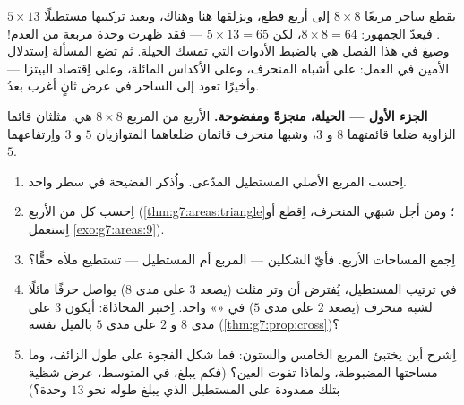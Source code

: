 \begin{problem}[{مسألة نهاية الأسبوع --- «برهان» مشهور على أن
$64 = 65$، تفضحه المساحات والميول، مع بيتزا وحلقات
للحلوى}]
\label{pb:g7:areas:1}
يقطع ساحر مربعًا $8 \times 8$ إلى أربع قطع، ويزلقها
هنا وهناك، ويعيد تركيبها مستطيلًا $5 \times 13$.
فيعدّ الجمهور: $8 \times 8 = 64$، لكن
$5 \times 13 = 65$ --- فقد ظهرت وحدة مربعة من
العدم! وصيغ  في هذا الفصل هي بالضبط الأدوات التي
تمسك الحيلة. ثم تضع المسألة اِستدلال  الأمين في
العمل: على أشباه المنحرف، وعلى الأكداس المائلة، وعلى اِقتصاد البيتزا ---
وأخيرًا تعود إلى الساحر في عرض ثانٍ أغرب
بعدُ.

\medskip
\noindent\textbf{الجزء الأول --- الحيلة، منجزةً ومفضوحة.}
 الأربع من المربع $8 \times 8$ هي: مثلثان قائما
الزاوية ضلعا قائمتهما $8$ و $3$، وشبها منحرف قائمان
ضلعاهما المتوازيان $5$ و $3$ واِرتفاعهما $5$.
\begin{enumerate}
  \item اِحسب  المربع الأصلي 
        المستطيل المدّعى. واُذكر الفضيحة في سطر واحد.
  \item اِحسب  كل  من  الأربع
        (\cref{thm:g7:areas:triangle}؛ ومن أجل شبهَي المنحرف، اِقطع
        أو اِستعمل \cref{exo:g7:areas:9}).
  \item اِجمع المساحات الأربع. فأيّ الشكلين --- المربع
        أم المستطيل --- تستطيع  ملأه حقًّا؟
  \item في ترتيب المستطيل، يُفترض أن وتر مثلث
        (يصعد $3$ على مدى $8$) يواصل حرفًا
        مائلًا لشبه منحرف (يصعد $2$ على مدى $5$) في
        «»  واحد. اِختبر المحاذاة: أيكون $3$ على مدى
        $8$ و $2$ على مدى $5$ بالميل نفسه
        (\cref{thm:g7:prop:cross})؟
  \item اِشرح أين يختبئ المربع الخامس والستون: فما شكل
        الفجوة على طول  الزائف، وما مساحتها المضبوطة،
        ولماذا تفوت العين؟ (فكم يبلغ، في المتوسط، عرض
        شظية بتلك  ممدودة على  المستطيل
        الذي يبلغ طوله نحو $13$ وحدة؟)
\end{enumerate}


\end{problem}
